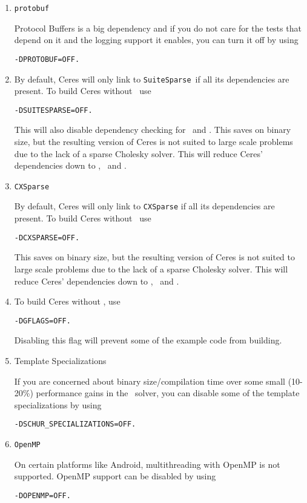 \begin{enumerate}
\item{\texttt{protobuf}}


Protocol Buffers is a big dependency and if you do not care for the tests that depend on it and the logging support it enables, you can turn it off by using
\begin{verbatim}
-DPROTOBUF=OFF.
\end{verbatim}

\item{\suitesparse}

By default, Ceres will only link to \texttt{SuiteSparse}\  if all its dependencies are present.
To build Ceres without \suitesparse\ use
\begin{verbatim}
-DSUITESPARSE=OFF.
\end{verbatim}
 This will also disable dependency checking for \lapack\ and \blas. This saves on binary size, but the resulting version of Ceres is not suited
to large scale problems due to the lack of a sparse Cholesky solver.  This will reduce Ceres' dependencies down to
\eigen, \gflags\ and \glog.

\item{\texttt{CXSparse}}

By default, Ceres will only link to \texttt{CXSparse} if all its dependencies are present.
To build Ceres without \suitesparse\ use
\begin{verbatim}
-DCXSPARSE=OFF.
\end{verbatim}

This saves on binary size, but the resulting version of Ceres is not suited to large scale problems due to the lack of a sparse Cholesky solver.  This will reduce Ceres' dependencies down to
\eigen, \gflags\ and \glog.

\item{\gflags}
To build Ceres without \gflags, use
\begin{verbatim}
-DGFLAGS=OFF.
\end{verbatim}
Disabling this flag will prevent some of the example code from building.

\item{Template Specializations}


If you are concerned about binary size/compilation time over some
small (10-20\%) performance gains in the \sparseschur\ solver, you can disable some of the template
specializations by using
\begin{verbatim}
-DSCHUR_SPECIALIZATIONS=OFF.
\end{verbatim}

\item{\texttt{OpenMP}}


On certain platforms like Android, multithreading with OpenMP is not supported. OpenMP support can be disabled by using
\begin{verbatim}
-DOPENMP=OFF.
\end{verbatim}
\end{enumerate}
